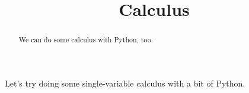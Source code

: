 \documentclass{ximera}
\title{Calculus}
\begin{document}
\begin{abstract}
  We can do some calculus with Python, too.
\end{abstract}

Let's try doing some single-variable calculus with a bit of Python.









\end{document}
